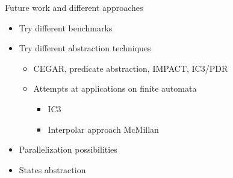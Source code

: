     
\begin{frame}{Future work and different approaches}
    \begin{itemize}
        \item Try different benchmarks
        \item Try different abstraction techniques
        \begin{itemize}
            \item CEGAR, predicate abstraction, IMPACT, IC3/PDR
            \item Attempts at applications on finite automata
            \begin{itemize}
                \item IC3
                \item Interpolar approach McMillan
            \end{itemize}
        \end{itemize}
        \item Parallelization possibilities
        \item States abstraction
    \end{itemize}
\end{frame}







